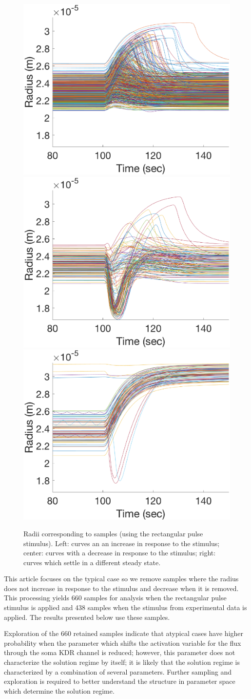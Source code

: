\begin{figure}[h]
\centering
\includegraphics[width=.3 \textwidth]{Figures/Increase_with_Stim_Curves.eps}
\includegraphics[width=.3 \textwidth]{Figures/Decrease_with_Stim_Curves.eps}
\includegraphics[width=.3 \textwidth]{Figures/Higher_Steady_State.eps}
\caption{Radii corresponding to samples (using the rectangular pulse stimulus). Left: curves an an increase in response to the stimulus; center: curves with a decrease in response to the stimulus; right: curves which settle in a different steady state.}
\label{solution_regimes}
\end{figure}

This article focuses on the typical case so we remove samples where the radius does not increase in response to the stimulus and decrease when it is removed. This processing yields 660 samples for analysis when the rectangular pulse stimulus is applied and 438 samples when the stimulus from experimental data is applied. The results presented below use these samples.

Exploration of the 660 retained samples indicate that atypical cases have higher probability when the parameter which shifts the activation variable for the \pot flux through the soma KDR channel is reduced;
 however, this parameter does not characterize the solution regime by itself; it is likely that the solution regime is characterized by a combination of several parameters. Further sampling and exploration is required to better understand the structure in parameter space which determine the solution regime.



